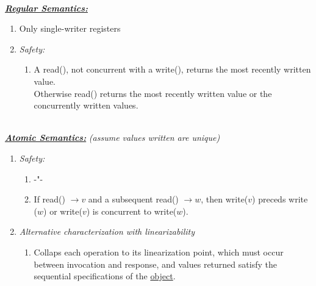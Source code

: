 \documentclass{article}
\begin{document}
\begin{adjustwidth}{2em}{2em}
\begin{adjustwidth}{2em}{2em}
\begin{adjustwidth}{2em}{2em}
\begin{center}
				\end{center}
				\hfill \\
				\underline{\textbf{\textit{Regular Semantics:}}}
				\begin{enumerate}[]
					\item Only single-writer registers
					\item \textit{Safety:}
					\begin{adjustwidth}{1em}{}
						\begin{enumerate}[]
							\item A read(), not concurrent with a write(), returns the most recently written value. \\
							Otherwise read() returns the most recently written value or the concurrently written values.
						\end{enumerate}
					\end{adjustwidth}
				\end{enumerate}
				\hfill \\
				\underline{\textbf{\textit{Atomic Semantics:}}} \textit{(assume values written are unique)}
				\begin{enumerate}[]
					\item \textit{Safety:}
					\begin{adjustwidth}{1em}{}
						\begin{enumerate}[(1)]
							\item -"-
							\item If read() $\rightarrow v$ and a subsequent read() $\rightarrow w$, then write($v$) preceds write ($w$) or write($v$) is concurrent to write($w$).
						\end{enumerate}
					\end{adjustwidth}
					\item \textit{Alternative characterization with linearizability}
					\begin{adjustwidth}{1em}{}
						\begin{enumerate}[]
							\item Collaps each operation to its linearization point, which must occur between invocation and response, and values returned satisfy the sequential specifications of the \underline{object}.

\end{enumerate}
\end{adjustwidth}
\end{enumerate}
\end{adjustwidth}
\end{adjustwidth}
\end{adjustwidth}
\end{document}

